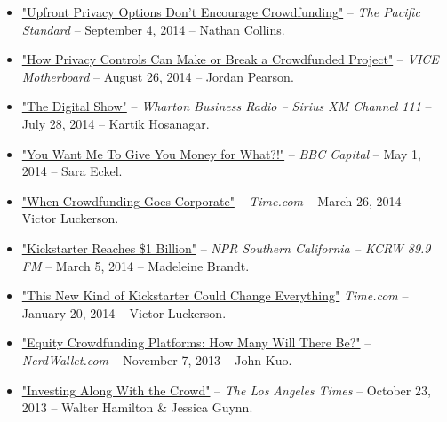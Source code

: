 \documentclass[10.5pt,letterpaper,sans]{moderncv}        %
\begin{document}
\begin{itemize}
\item \textcolor{gray}{\href{http://www.psmag.com/navigation/nature-and-technology/privacy-doesnt-encourage-crowdfunding-90061/}{"Upfront Privacy Options Don't Encourage Crowdfunding"}} -- \textit{The Pacific Standard} -- September 4, 2014 -- Nathan Collins.

\item \textcolor{gray}{\href{http://motherboard.vice.com/en_ca/read/how-privacy-controls-can-make-or-break-a-crowdfunded- project}{"How Privacy Controls Can Make or Break a Crowdfunded Project"}} -- \textit{VICE Motherboard} -- August 26, 2014 -- Jordan Pearson.

\item \textcolor{gray}{\href{http://www.siriusxm.com/businessradio}{"The Digital Show"}} -- \textit{Wharton Business Radio -- Sirius XM Channel 111} -- July 28, 2014 -- Kartik Hosanagar.

\item \textcolor{gray}{\href{http://www.bbc.com/capital/story/20140501-you-want-money-for-what}{"You Want Me To Give You Money for What?!"}} -- \textit{BBC Capital} -- May 1, 2014 -- Sara Eckel.

\item \textcolor{gray}{\href{http://time.com/39271/oculus-facebook-kickstarter-backlash/}{"When Crowdfunding Goes Corporate"}} -- \textit{Time.com} -- March 26, 2014 -- Victor Luckerson.

\item \textcolor{gray}{\href{http://www.kcrw.com/etc/programs/pp/pp140305vaping_chevron_in_ec}{"Kickstarter Reaches \$1 Billion"}} -- \textit{NPR Southern California -- KCRW 89.9 FM} -- March 5, 2014 -- Madeleine Brandt.

\item \textcolor{gray}{\href{http://business.time.com/2014/01/20/ibm-internal-enterprise-crowdfunding-mimics-kickstarter/}{"This New Kind of Kickstarter Could Change Everything"}} \textit{Time.com} -- January 20, 2014 -- Victor Luckerson.

\item \textcolor{gray}{\href{http://www.nerdwallet.com/blog/investing/2013/equity-crowdfunding-platforms/}{"Equity Crowdfunding Platforms: How Many Will There Be?"}} -- \textit{NerdWallet.com} -- November 7, 2013 -- John Kuo.

\item \textcolor{gray}{\href{http://articles.latimes.com/2013/oct/23/business/la-fi-crowdfunding-20131024}{"Investing Along With the Crowd"}} -- \textit{The Los Angeles Times} -- October 23, 2013 -- Walter Hamilton \& Jessica Guynn.


\end{itemize}
\end{document}

